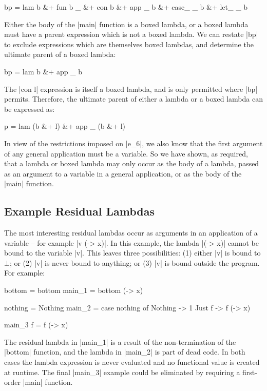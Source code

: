 \ignore\begin{code}
bp = lam b &+ fun b _ &+ con b &+ app _ b &+ case_ _ b &+ let_ _ b
\end{code}

Either the body of the |main| function is a boxed lambda, or a boxed lambda must have a parent expression which is not a boxed lambda. We can restate |bp| to exclude expressions which are themselves boxed lambdas, and determine the ultimate parent of a boxed lambda:

\ignore\begin{code}
bp = lam b &+ app _ b
\end{code}

The |con l| expression is itself a boxed lambda, and is only permitted where |bp| permits. Therefore, the ultimate parent of either a lambda or a boxed lambda can be expressed as:

\ignore\begin{code}
p = lam (b &+ l) &+ app _ (b &+ l)
\end{code}

In view of the restrictions imposed on |e_6|, we also know that the first argument of any general application must be a variable. So we have shown, as required, that a lambda or boxed lambda may only occur as the body of a lambda, passed as an argument to a variable in a general application, or as the body of the |main| function.

\subsection{Example Residual Lambdas}
\label{secF:example_residual}

The most interesting residual lambdas occur as arguments in an application of a variable -- for example |v (\x -> x)|. In this example, the lambda |(\x -> x)| cannot be bound to the variable |v|. This leaves three possibilities: (1) either |v| is bound to $\bot{}$; or (2) |v| is never bound to anything; or (3) |v| is bound outside the program. For example:

\begin{code}
bottom = bottom
main_1 = bottom (\x -> x)

nothing = Nothing
main_2 = case  nothing of
               Nothing  -> 1
               Just f   -> f (\x -> x)

main_3 f = f (\x -> x)
\end{code}

The residual lambda in |main_1| is a result of the non-termination of the |bottom| function, and the lambda in |main_2| is part of dead code. In both cases the lambda expression is never evaluated and no functional value is created at runtime. The final |main_3| example could be eliminated by requiring a first-order |main| function.

